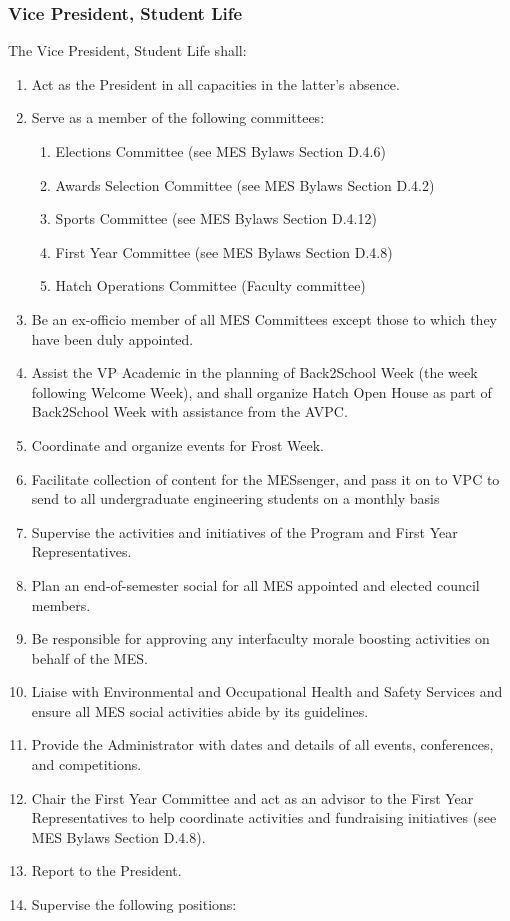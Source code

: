 \hypertarget{vice-president-student-life}{%
 \subsubsection{Vice President, Student
  Life}
 \label{vice-president-student-life}}
The Vice President, Student Life shall:

\begin{enumerate}
 \item
  Act as the President in all capacities in the latter's absence.
 \item
  Serve as a member of the following committees:

  \begin{enumerate}
   \item
    Elections Committee (see MES Bylaws Section D.4.6)
   \item
    Awards Selection Committee (see MES Bylaws Section D.4.2)
   \item
    Sports Committee (see MES Bylaws Section D.4.12)
   \item
    First Year Committee (see MES Bylaws Section D.4.8)
   \item
    Hatch Operations Committee (Faculty committee)
  \end{enumerate}
 \item
  Be an ex-officio member of all MES Committees except those to which
  they have been duly appointed.
 \item
  Assist the VP Academic in the planning of Back2School Week (the week
  following Welcome Week), and shall organize Hatch Open House as part
  of Back2School Week with assistance from the AVPC.
 \item
  Coordinate and organize events for Frost Week.
 \item
  Facilitate collection of content for the MESsenger, and pass it on to
  VPC to send to all undergraduate engineering students on a monthly
  basis
 \item
  Supervise the activities and initiatives of the Program and First Year
  Representatives.
 \item
  Plan an end-of-semester social for all MES appointed and elected
  council members.
 \item
  Be responsible for approving any interfaculty morale boosting
  activities on behalf of the MES.
 \item
  Liaise with Environmental and Occupational Health and Safety Services
  and ensure all MES social activities abide by its guidelines.
 \item
  Provide the Administrator with dates and details of all events,
  conferences, and competitions.
 \item
  Chair the First Year Committee and act as an advisor to the First Year
  Representatives to help coordinate activities and fundraising
  initiatives (see MES Bylaws Section D.4.8).
 \item
  Report to the President.
 \item
  Supervise the following positions:


\end{enumerate}
